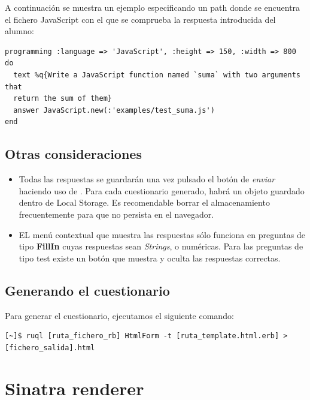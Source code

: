 A continuaci\'on se muestra un ejemplo especificando un path donde se encuentra el fichero JavaScript con el que se comprueba la respuesta introducida del alumno:
\begin{lstlisting}
programming :language => 'JavaScript', :height => 150, :width => 800  do
  text %q{Write a JavaScript function named `suma` with two arguments that
  return the sum of them}
  answer JavaScript.new(:'examples/test_suma.js')
end
\end{lstlisting}

\subsection{Otras consideraciones}
\label{subsec:Apendice2.9}

\begin{itemize}
  \item Todas las respuestas se guardar\'an una vez pulsado el bot\'on de \textit{enviar} haciendo uso de . Para cada cuestionario generado, habr\'a 
  un objeto guardado dentro de Local Storage. Es recomendable borrar el almacenamiento frecuentemente para que no persista en el navegador.
  \item EL men\'u contextual que muestra las respuestas s\'olo funciona en preguntas de tipo {\bfseries FillIn} cuyas respuestas sean \textit{Strings},  o num\'ericas.
  Para las preguntas de tipo test existe un bot\'on que muestra y oculta las respuestas correctas.
\end{itemize}

\subsection{Generando el cuestionario}
\label{subsec:Apendice2.10}

Para generar el cuestionario, ejecutamos el siguiente comando:
\begin{verbatim}
[~]$ ruql [ruta_fichero_rb] HtmlForm -t [ruta_template.html.erb] > [fichero_salida].html
\end{verbatim}
\newpage

\section{Sinatra renderer}
\label{Apendice2:sinatra}


